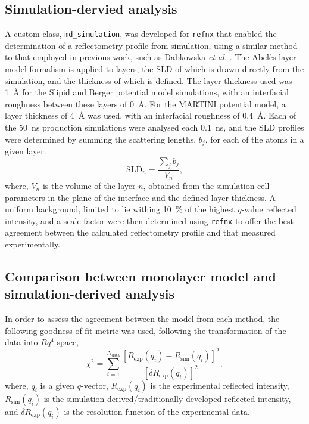 \subsection{Simulation-dervied analysis}
A custom-class, \texttt{md\_simulation}, was developed for \texttt{refnx} \cite{nelson_refnx_2019,nelson_refnx_2019-1} that enabled the determination of a reflectometry profile from simulation, using a similar method to that employed in previous work, such as Dabkowska \emph{et al.} \cite{dabkowska_modulation_2014}.
The Abel\`{e}s layer model formalism is applied to layers, the SLD of which is drawn directly from the simulation, and the thickness of which is defined.
The layer thickness used was \SI{1}{\angstrom} for the Slipid and Berger potential model simulations, with an interfacial roughness between these layers of \SI{0}{\angstrom}.
For the MARTINI potential model, a layer thickness of \SI{4}{\angstrom} was used, with an interfacial roughness of \SI{0.4}{\angstrom}. Each of the \SI{50}{\nano\second} production simulations were analysed each \SI{0.1}{\nano\second}, and the SLD profiles were determined by summing the scattering lengths, $b_j$, for each of the atoms in a given layer.
%
\begin{equation}
\text{SLD}_n = \frac{\sum_j b_j}{V_n},
\end{equation}
%
where, $V_n$ is the volume of the layer $n$, obtained from the simulation cell parameters in the plane of the interface and the defined layer thickness.
A uniform background, limited to lie withing \SI{10}{\percent} of the highest $q$-value reflected intensity, and a scale factor were then determined using \texttt{refnx} to offer the best agreement between the calculated reflectometry profile and that measured experimentally.

\subsection{Comparison between monolayer model and simulation-derived analysis}
In order to assess the agreement between the model from each method, the following goodness-of-fit metric was used, following the transformation of the data into $Rq^4$ space,
%
\begin{equation}
\chi^2 = \sum_{i=1}^{N_{\text{data}}}{\frac{[R_{\text{exp}}(q_i) - R_{\text{sim}}(q_i)]^2}{[\delta R_{\text{exp}}(q_i)]^2}},
\end{equation}
%
where, $q_i$ is a given $q$-vector, $R_{\text{exp}}(q_i)$ is the experimental reflected intensity, $R_{\text{sim}}(q_i)$ is the simulation-derived/traditionally-developed reflected intensity, and $\delta R_{\text{exp}}(q_i)$ is the resolution function of the experimental data.

